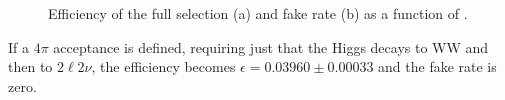 \begin{figure}[t]
\centering
{}
\caption{Efficiency of the full selection (a) and fake rate (b) as a function of \pth.\label{fig:sel_eff}}
\end{figure}

If a $4\pi$ acceptance is defined, requiring just that the Higgs decays to WW and then to $2\ell2\nu$, the efficiency becomes $\epsilon=0.03960\pm{0.00033}$ and the fake rate is zero. 






